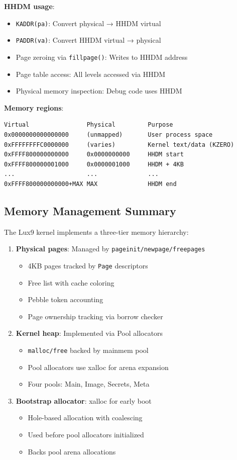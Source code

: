 \documentclass[11pt,letterpaper]{article}
\begin{document}
\textbf{HHDM usage}:
\begin{itemize}
\item \texttt{KADDR(pa)}: Convert physical → HHDM virtual
\item \texttt{PADDR(va)}: Convert HHDM virtual → physical
\item Page zeroing via \texttt{fillpage()}: Writes to HHDM address
\item Page table access: All levels accessed via HHDM
\item Physical memory inspection: Debug code uses HHDM
\end{itemize}

\textbf{Memory regions}:
\begin{verbatim}
Virtual                Physical         Purpose
0x0000000000000000     (unmapped)       User process space
0xFFFFFFFFC0000000     (varies)         Kernel text/data (KZERO)
0xFFFF800000000000     0x0000000000     HHDM start
0xFFFF800000001000     0x0000001000     HHDM + 4KB
...                    ...              ...
0xFFFF800000000000+MAX MAX              HHDM end
\end{verbatim}

\subsection{Memory Management Summary}

The Lux9 kernel implements a three-tier memory hierarchy:

\begin{enumerate}
\item \textbf{Physical pages}: Managed by \texttt{pageinit/newpage/freepages}
  \begin{itemize}
  \item 4KB pages tracked by \texttt{Page} descriptors
  \item Free list with cache coloring
  \item Pebble token accounting
  \item Page ownership tracking via borrow checker
  \end{itemize}

\item \textbf{Kernel heap}: Implemented via Pool allocators
  \begin{itemize}
  \item \texttt{malloc/free} backed by mainmem pool
  \item Pool allocators use xalloc for arena expansion
  \item Four pools: Main, Image, Secrets, Meta
  \end{itemize}

\item \textbf{Bootstrap allocator}: xalloc for early boot
  \begin{itemize}
  \item Hole-based allocation with coalescing
  \item Used before pool allocators initialized
  \item Backs pool arena allocations
  \end{itemize}
\end{enumerate}
\end{document}
